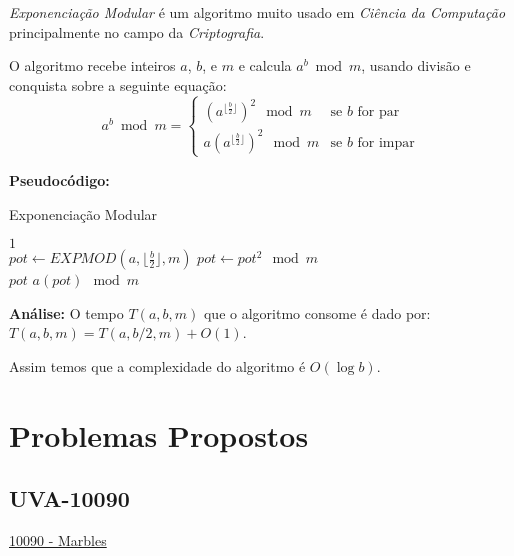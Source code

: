 \textit{Exponenciação Modular} é um algoritmo muito usado em \textit{Ciência da Computação} principalmente no campo da \textit{Criptografia}.

O algoritmo recebe inteiros $a$, $b$, e $m$ e calcula $a^b\bmod m$, usando divisão e conquista sobre a seguinte equação:
\[
 a^b\bmod m = 
  \begin{cases} 
   (a^{\lfloor \frac{b}{2} \rfloor})^2 \mod m& \text{se } b \text{ for par} \\
   a(a^{\lfloor \frac{b}{2} \rfloor})^2 \mod m& \text{se } b \text{ for impar} 
  \end{cases}
\]
\clearpage

\textbf{Pseudocódigo:}
\begin{algorithm}
\caption{Exponenciação Modular}
\begin{algorithmic}[1]
\State \Return $1$
\EndIf 
\\
\State $pot \gets EXPMOD(a, \lfloor \frac{b}{2} \rfloor, m)$
\State $pot \gets pot^2 \mod m$
\\
\State \Return $pot$
\Else
\State \Return $a(pot) \mod m$
\EndIf

\EndProcedure
\end{algorithmic}
\end{algorithm}


\textbf{Análise:}
O tempo $T(a,b,m)$ que o algoritmo consome é dado por: $T(a,b,m) = T(a,b/2,m)+O(1)$.

Assim temos que a complexidade do algoritmo é $O(\log b)$.



\section{Problemas Propostos}



\subsection{UVA-10090}
\href{https://uva.onlinejudge.org/index.php?option=onlinejudge&page=show_problem&problem=1031}{10090 - Marbles}\\


